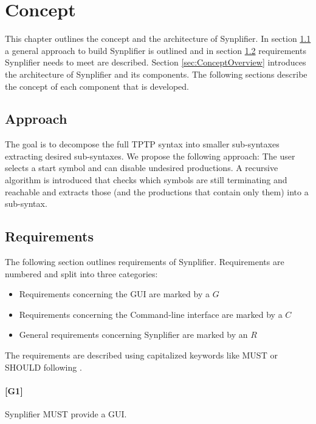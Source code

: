 
\chapter{Concept}\label{cha:Concept}
This chapter outlines the concept and the architecture of \ac{Synplifier}.
In section \ref{sec:ConceptApproach} a general approach to build \ac{Synplifier} is outlined and in section \ref{sec:ConceptRequirements} requirements \ac{Synplifier} needs to meet are described.
Section \ref{sec:ConceptOverview} introduces the architecture of \ac{Synplifier} and its components.
The following sections describe the concept of each component that is developed.

\section{Approach}\label{sec:ConceptApproach}

The goal is to decompose the full \ac{TPTP} syntax into smaller sub-syntaxes extracting desired sub-syntaxes. We propose the following approach: The user selects a start symbol and can disable undesired productions. A recursive algorithm is introduced that checks which symbols are still terminating and reachable and extracts those (and the productions that contain only them) into a sub-syntax.

\section{Requirements}\label{sec:ConceptRequirements}

The following section outlines requirements of \ac{Synplifier}.
Requirements are numbered and split into three categories: 

\begin{itemize}
\item Requirements concerning the GUI are marked by a $G$
\item Requirements concerning the Command-line interface are marked by a $C$
\item General requirements concerning \ac{Synplifier} are marked by an $R$
\end{itemize}

The requirements are described using capitalized keywords like MUST or SHOULD following \cite{Bradner.1997}.

\subsubsection{[G1]}\label{G1}
\ac{Synplifier} MUST provide a GUI.
